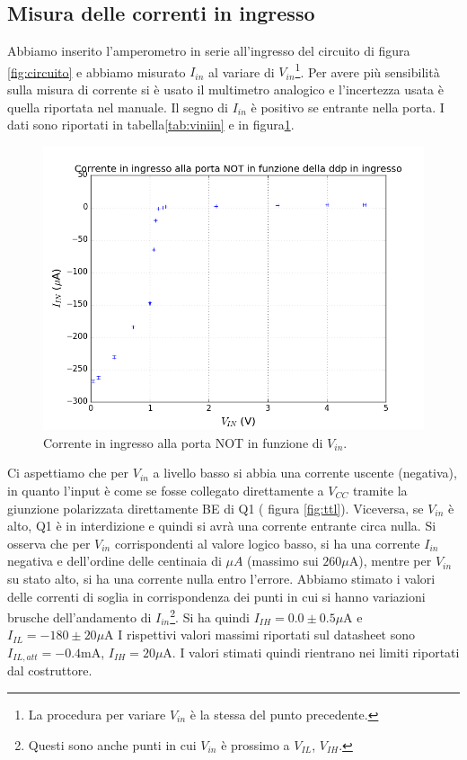 \documentclass[10pt,a4paper]{article}
\begin{document}
\subsection{Misura delle correnti in ingresso}
Abbiamo inserito l'amperometro in serie all'ingresso del circuito di figura \ref{fig:circuito} e abbiamo misurato $I_{in}$ al variare di $V_{in}$\footnote{La procedura per variare $V_{in}$ è la stessa del punto precedente.}. Per avere più sensibilità sulla misura di corrente si è usato il multimetro analogico e l'incertezza usata è quella riportata nel manuale. Il segno di $I_{in}$ è positivo se entrante nella porta.
I dati sono riportati in tabella\ref{tab:viniin} e in figura\ref{fig:viniin}.
\begin{figure}[!htb]
\centering
\includegraphics[scale=0.9]{viniin.png}
\caption{Corrente in ingresso alla porta NOT in funzione di $V_{in}$.\label{fig:viniin}}
\end{figure}
Ci aspettiamo che per $V_{in}$ a livello basso si abbia una corrente uscente (negativa), in quanto l'input è come se fosse collegato direttamente a $V_{CC}$ tramite la giunzione polarizzata direttamente BE di Q1 ( figura \ref{fig:ttl}). Viceversa, se $V_{in}$ è alto, Q1 è in interdizione e quindi si avrà una corrente entrante circa nulla.
Si osserva che per $V_{in}$ corrispondenti al valore logico basso, si ha una corrente $I_{in}$ negativa e dell'ordine delle centinaia di $\mu A$ (massimo sui $260\mu \mbox{A}$), mentre per $V_{in}$ su stato alto, si ha una corrente nulla entro l'errore.
Abbiamo stimato i valori delle correnti di soglia in corrispondenza dei punti in cui si hanno variazioni brusche dell'andamento di $I_{in}$\footnote{Questi sono anche punti in cui $V_{in}$ è prossimo a $V_{IL}$, $V_{IH}$.}.
Si ha quindi $I_{IH}=0.0\pm0.5\mu \mbox{A}$ e $I_{IL}=-180\pm20\mu\mbox{A}$
I rispettivi valori massimi riportati sul datasheet sono $I_{IL,att}=-0.4\mbox{mA}$, $I_{IH}=20\mu\mbox{A}$. 
I valori stimati quindi rientrano nei limiti riportati dal costruttore. 
\end{document}
